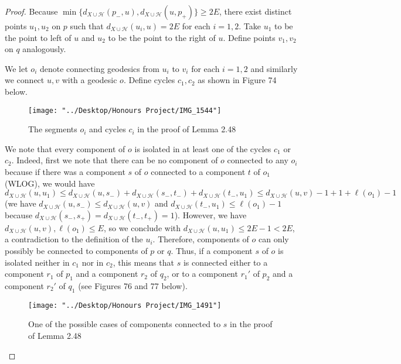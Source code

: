 \documentclass[12pt]{article}
\newcommand{\vs}{\vskip10pt}
\begin{document}
	
	\begin{proof}
		
		Because $\min \{d_{X \cup \mathcal{H}}(p_{-}, u), d_{X \cup \mathcal{H}}(u, p_{+})\} \geq 2 E$, there exist distinct points $u_1, u_2$ on $p$ such that $d_{X \cup \mathcal{H}}(u_i, u) = 2 E$ for each $i = 1,2$. Take $u_1$ to be the point to left of $u$ and $u_2$ to be the point to the right of $u$. Define points $v_1, v_2$ on $q$ analogously. 
		
		\vs 
		
		We let $o_i$ denote connecting geodesics from $u_i$ to $v_i$ for each $i = 1,2$ and similarly we connect $u,v$ with a geodesic $o$. Define cycles $c_1, c_2$ as shown in Figure 74 below. 
		
\begin{figure} [H]
	\centering
	\texttt{[image: "../Desktop/Honours Project/IMG\_1544"]}
	\caption{The segments $o_i$ and cycles $c_i$ in the proof of Lemma 2.48}
	\label{fig:img1544}
\end{figure}

		We note that every component of $o$ is isolated in at least one of the cycles $c_1$ or $c_2$. Indeed, first we note that there can be no component of $o$ connected to any $o_i$ because if there was a component $s$ of $o$ connected to a component $t$ of $o_1$ (WLOG), we would have $d_{X \cup \mathcal{H}}(u,u_1) \leq d_{X \cup \mathcal{H}}(u, s_{-}) + d_{X \cup \mathcal{H}} (s_{-}, t_{-}) + d_{X \cup \mathcal{H}} (t_{-}, u_1) \leq d_{X \cup \mathcal{H}} (u,v) - 1 + 1 + \ell(o_1) - 1$ (we have $d_{X \cup \mathcal{H}} (u, s_{-}) \leq d_{X \cup \mathcal{H}} (u,v)$ and $d_{X \cup \mathcal{H}} (t_{-}, u_1) \leq \ell(o_1) - 1$ because $d_{X \cup \mathcal{H}} (s_{-}, s_{+}) = d_{X \cup \mathcal{H}} (t_{-}, t_{+}) = 1$). However, we have $d_{X \cup \mathcal{H}}(u,v), \ell(o_1) \leq E$, so we conclude with $d_{X \cup \mathcal{H}} (u,u_1) \leq 2E -1 < 2E$, a contradiction to the definition of the $u_i$. Therefore, components of $o$ can only possibly be connected to components of $p$ or $q$. Thus, if a component $s$ of $o$ is isolated neither in $c_1$ nor in $c_2$, this means that $s$ is connected either to a component $r_1$ of $p_1$ and a component $r_2$ of $q_2$, or to a component $r_1'$ of $p_2$ and a component $r_2'$ of $q_1$ (see Figures 76 and 77 below).
		
		
\begin{figure} [H]
	\centering
	\texttt{[image: "../Desktop/Honours Project/IMG\_1491"]}
	\caption{One of the possible cases of components connected to $s$ in the proof of Lemma 2.48}
	\label{fig:img1491}
\end{figure}


\end{proof}
\end{document}
